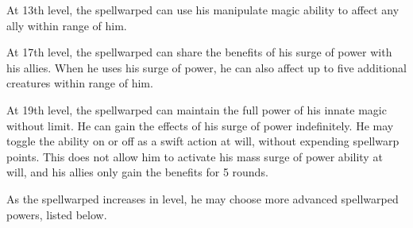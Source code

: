  At 13th level, the spellwarped can use his manipulate magic ability to affect any ally within \rngmed range of him.

 At 17th level, the spellwarped can share the benefits of his surge of power with his allies. When he uses his surge of power, he can also affect up to five additional creatures within \rngmed range of him.

 At 19th level, the spellwarped can maintain the full power of his innate magic without limit. He can gain the effects of his surge of power indefinitely. He may toggle the ability on or off as a swift action at will, without expending spellwarp points. This does not allow him to activate his mass surge of power ability at will, and his allies only gain the benefits for 5 rounds.

As the spellwarped increases in level, he may choose more advanced spellwarped powers, listed below.

